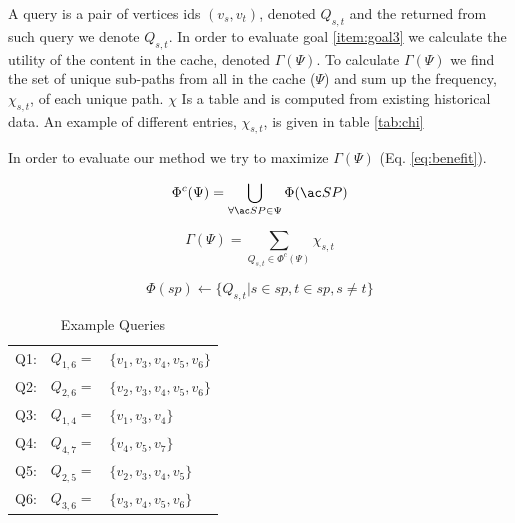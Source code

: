 A query is a pair of vertices ids $(v_s, v_t)$, denoted $Q_{s,t}$ and the \spath returned from such query we denote $Q_{s,t}$. 
In order to evaluate goal \ref{item:goal3} we calculate the utility of the content in the cache, denoted $\Gamma(\Psi)$. To calculate $\Gamma(\Psi)$ we find the set of unique sub-paths from all \spaths in the cache ($\Psi$) and sum up the frequency, $\chi_{s,t}$, of each unique path.
$\chi$ Is a table and is computed from existing historical data. An example of different entries, $\chi_{s,t}$, is given in table \ref{tab:chi}

In order to evaluate our method we try to maximize $\Gamma(\Psi)$ (Eq. \ref{eq:benefit}).



\begin{equation} \label{eq:upsi}
 \Phi^c(\Psi) = \bigcup\limits_{\forall \spath \in \Psi} \Phi(\spath)
\end{equation}

\begin{equation} \label{eq:benefit}
\Gamma(\Psi) = \sum\limits_{Q_{s,t} \in \Phi^c(\Psi)} \chi_{s,t}
\end{equation}

\begin{equation} \label{eq:phi}
\Phi(sp) \leftarrow \{ Q_{s,t} | s \in sp, t \in sp, s \neq t\}
\end{equation}


\begin{table}
\begin{tabular}{l l p{}}
Q1:	&	$Q_{1,6} =$ 	& $\{v_1,v_3,v_4,v_5,v_6\}$\\
Q2:	&	$Q_{2,6} =$ 	& $\{v_2,v_3,v_4,v_5,v_6\}$ \\
Q3:	&	$Q_{1,4} =$ 	& $\{v_1,v_3,v_4\}$ \\
Q4:	&	$Q_{4,7} =$ 	& $\{v_4,v_5,v_7\}$ \\
Q5:	&	$Q_{2,5} =$ 	& $\{v_2,v_3,v_4,v_5\}$ \\
Q6:	&	$Q_{3,6} =$ 	& $\{v_3,v_4,v_5,v_6\}$ \\
\end{tabular}
\caption{Example Queries}
\label{tab:queries}
\end{table}

